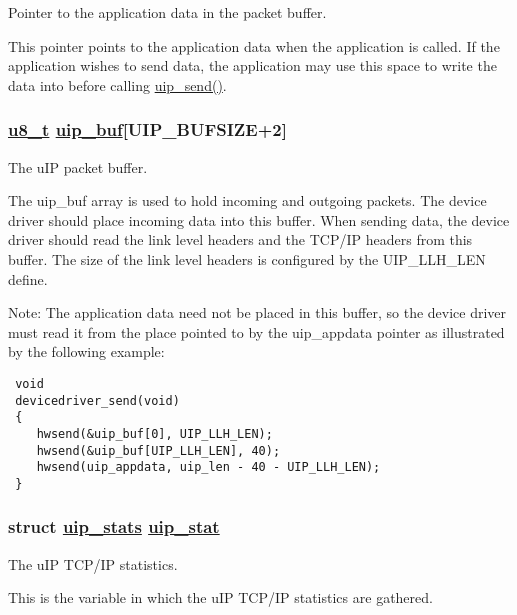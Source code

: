 Pointer to the application data in the packet buffer. 

This pointer points to the application data when the application is called. If the application wishes to send data, the application may use this space to write the data into before calling \hyperlink{a00064_gb59415b2801e568f52bc1d86ef10e159}{uip\_\-send()}. \hypertarget{a00059_gb81e78f890dbbee50c533a9734b74fd9}{
\subsubsection[uip\_\-buf]{\setlength{\rightskip}{0pt plus 5cm}\hyperlink{a00070_ge081489b4906f65a3cb18e9fbe9f8d23}{u8\_\-t} \hyperlink{a00059_gb81e78f890dbbee50c533a9734b74fd9}{uip\_\-buf}\mbox{[}UIP\_\-BUFSIZE+2\mbox{]}}}
\label{a00059_gb81e78f890dbbee50c533a9734b74fd9}


The u\-IP packet buffer. 

The uip\_\-buf array is used to hold incoming and outgoing packets. The device driver should place incoming data into this buffer. When sending data, the device driver should read the link level headers and the TCP/IP headers from this buffer. The size of the link level headers is configured by the UIP\_\-LLH\_\-LEN define.

\begin{Desc}
\item[Note:]The application data need not be placed in this buffer, so the device driver must read it from the place pointed to by the uip\_\-appdata pointer as illustrated by the following example: 

\footnotesize\begin{verbatim} void
 devicedriver_send(void)
 {
    hwsend(&uip_buf[0], UIP_LLH_LEN);
    hwsend(&uip_buf[UIP_LLH_LEN], 40);
    hwsend(uip_appdata, uip_len - 40 - UIP_LLH_LEN);
 }
\end{verbatim}
\normalsize
 \end{Desc}
\hypertarget{a00059_g9ee50a40597e67fce96541ab56c3b712}{
\subsubsection[uip\_\-stat]{\setlength{\rightskip}{0pt plus 5cm}struct \hyperlink{a00031}{uip\_\-stats} \hyperlink{a00059_g9ee50a40597e67fce96541ab56c3b712}{uip\_\-stat}}}
\label{a00059_g9ee50a40597e67fce96541ab56c3b712}


The u\-IP TCP/IP statistics. 

This is the variable in which the u\-IP TCP/IP statistics are gathered. 